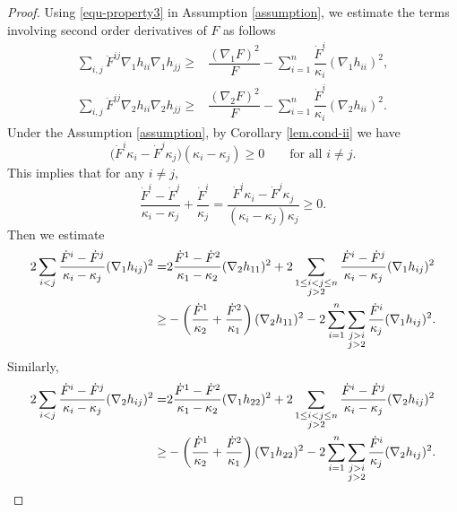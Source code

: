\documentclass[11pt,reqno]{amsart}
\theoremstyle{remark}
\numberwithin{equation}{section}
\begin{document}
\begin{proof}
  Using \eqref{equ-property3} in Assumption \ref{assumption}, we estimate the terms involving second order derivatives of $F$ as follows 
    \begin{align}
        \sum\limits_{i,j} \ddot{F}^{ij}\nabla_1 h_{ii}\nabla_1 h_{jj}\geq &\dfrac{(\nabla_1 F)^2}{F} - \sum\limits_{i=1}^n \dfrac{\dot{F}^i}{\kappa_i}(\nabla_1 h_{ii})^2,\label{s3.d2F}\\
          \sum\limits_{i,j} \ddot{F}^{ij}\nabla_2 h_{ii}\nabla_2 h_{jj}\geq &\dfrac{(\nabla_2 F)^2}{F} - \sum\limits_{i=1}^n \dfrac{\dot{F}^i}{\kappa_i}(\nabla_2 h_{ii})^2. \label{s3.d2Fb}
    \end{align}
Under the Assumption \ref{assumption}, by Corollary \ref{lem.cond-ii} we have
\[
 \big(\dot F^i\kappa_i-\dot F^j\kappa_j\big)(\kappa_i-\kappa_j)\ge 0
\qquad \text{for all } i\neq j.   
\]
This implies that for any $i\neq j$,
    \begin{equation*}
    	\dfrac{\dot{F}^i-\dot{F}^j}{\kappa_i - \kappa_j} + \dfrac{\dot{F}^i}{\kappa_j}=\dfrac{\dot{F}^i\kappa_i-\dot{F}^j\kappa_j}{(\kappa_i-\kappa_j)\kappa_j} \geq 0.%
    \end{equation*}
    Then we estimate
    \begin{align}
    	2 \sum\limits_{i<j} \dfrac{\dot{F}^i - \dot{F}^j}{\kappa_i-\kappa_j}(\nabla_1 h_{ij})^2
    	=& 2\dfrac{\dot{F}^1-\dot{F}^2}{\kappa_1-\kappa_2}(\nabla_2 h_{11})^2 + 2 \sum\limits_{\substack{1\leq i<j\leq n\\j>2}}\dfrac{\dot{F}^i -\dot{F}^j}{\kappa_i -\kappa_j}(\nabla_1 h_{ij})^2 \notag\\
    	\geq& -\left(\dfrac{\dot{F}^1}{\kappa_2}+\dfrac{\dot{F}^2}{\kappa_1}\right)(\nabla_2 h_{11})^2 - 2 \sum\limits_{i=1}^n\sum\limits_{\substack{j>i\\j>2}}\dfrac{\dot{F}^i}{\kappa_j}(\nabla_1 h_{ij})^2.
    	\label{equ-estd1}
    \end{align}
    Similarly,
    \begin{align}
    	2 \sum\limits_{i<j} \dfrac{\dot{F}^i - \dot{F}^j}{\kappa_i-\kappa_j}(\nabla_2 h_{ij})^2 	=& 2\dfrac{\dot{F}^1-\dot{F}^2}{\kappa_1-\kappa_2}(\nabla_1 h_{22})^2 + 2 \sum\limits_{\substack{1\leq i<j\leq n\\j>2}}\dfrac{\dot{F}^i -\dot{F}^j}{\kappa_i -\kappa_j}(\nabla_2 h_{ij})^2 \notag\\
    	\geq& -\left(\dfrac{\dot{F}^1}{\kappa_2}+\dfrac{\dot{F}^2}{\kappa_1}\right)(\nabla_1 h_{22})^2 - 2 \sum\limits_{i=1}^n\sum\limits_{\substack{j>i\\j>2}}\dfrac{\dot{F}^i}{\kappa_j}(\nabla_2 h_{ij})^2.

\end{align}
\end{proof}
\end{document}

